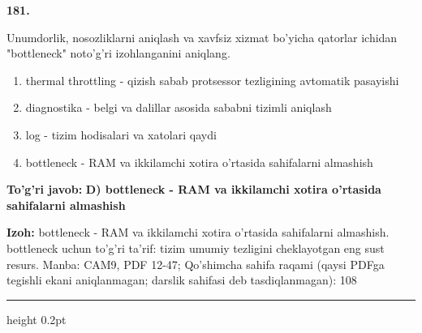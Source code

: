\documentclass[10pt,a4paper]{article}
\begin{document}
{\bfseries\sffamily\color{ink} 181.}
\par
Unumdorlik, nosozliklarni aniqlash va xavfsiz xizmat bo'yicha qatorlar ichidan "bottleneck" noto'g'ri izohlanganini aniqlang.
\begin{enumerate}[label=\Alph*),leftmargin=9mm]
\item thermal throttling - qizish sabab protsessor tezligining avtomatik pasayishi
\item diagnostika - belgi va dalillar asosida sababni tizimli aniqlash
\item log - tizim hodisalari va xatolari qaydi
\item bottleneck - RAM va ikkilamchi xotira o'rtasida sahifalarni almashish
\end{enumerate}
\begin{tcolorbox}[enhanced,breakable,colback=teal!4,colframe=teal!60!black,boxrule=0.45pt,arc=1.2mm,left=2.7mm,right=2.7mm,top=1.8mm,bottom=1.8mm,before skip=2mm,after skip=2mm]
{\bfseries\sffamily\color{teal}To'g'ri javob:} \textbf{D) bottleneck - RAM va ikkilamchi xotira o'rtasida sahifalarni almashish}
\par\smallskip
{\bfseries Izoh:} bottleneck - RAM va ikkilamchi xotira o'rtasida sahifalarni almashish. bottleneck uchun to'g'ri ta'rif: tizim umumiy tezligini cheklayotgan eng sust resurs. Manba: CAM9, PDF 12-47; Qo'shimcha sahifa raqami (qaysi PDFga tegishli ekani aniqlanmagan; darslik sahifasi deb tasdiqlanmagan): 108
\end{tcolorbox}
\vspace{2mm}\hrule height 0.2pt\vspace{3mm}
\end{document}
